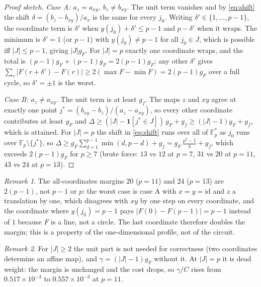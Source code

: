 \documentclass[11pt]{article}
\theoremstyle{remark}
\newtheorem{remark}{Remark}
\newcommand{\F}{\mathbb{F}}
\newcommand{\cost}{C}
\newcommand{\gam}{\gamma}
\newcommand{\abs}[1]{\lvert #1 \rvert}
\newcommand{\ind}[1]{\mathbf{1}[#1]}
\begin{document}
\begin{proof}[Proof sketch]
\emph{Case A: $a_z = a_{xy}$, $b_z \ne b_{xy}$.} The unit term vanishes and by \eqref{eq:shift} the shift
$\delta = (b_z - b_{xy})/a_x$ is the same for every $j_0$. Writing $\delta' \in \{1, \dots, p-1\}$, the coordinate term is $\delta'$
when $y(j_0) + \delta' \le p-1$ and $p - \delta'$ when it wraps. The minimum is $\delta' = 1$ (or $p-1$) with $y(j_0) \ne p-1$ for all
$j_0 \in J$, which is possible iff $\abs{J} \le p-1$, giving $\abs{J} g_F$. For $\abs{J} = p$ exactly one coordinate wraps, and the
total is $(p-1) g_F + (p-1) g_F = 2(p-1) g_F$; any other $\delta'$ gives $\sum_r \abs{F(r+\delta') - F(r)} \ge 2(\max F - \min F) = 2(p-1) g_F$
over a full cycle, so $\delta' = \pm 1$ is the worst.

\emph{Case B: $a_z \ne a_{xy}$.} The unit term is at least $g_f$. The maps $z$ and $xy$ agree at exactly one point
$j^{*} = (b_{xy} - b_z)/(a_z - a_{xy})$, so every other coordinate contributes at least $g_F$ and
$\Delta \ge (\abs{J} - \ind{j^{*} \in J})\, g_F + g_f \ge (\abs{J}-1) g_F + g_f$, which is attained. For $\abs{J} = p$ the shift in
\eqref{eq:shift} runs over all of $\F_p^{*}$ as $j_0$ runs over $\F_p \setminus \{j^{*}\}$, so
$\Delta \ge g_F \sum_{d=1}^{p-1} \min(d, p-d) + g_f = g_F\,\tfrac{p^2-1}{4} + g_f$, which exceeds $2(p-1) g_F$ for $p \ge 7$
(brute force: $13$ vs $12$ at $p=7$, $31$ vs $20$ at $p=11$, $43$ vs $24$ at $p=13$).
\end{proof}

\begin{remark}
The all-coordinates margins $20$ ($p=11$) and $24$ ($p=13$) are $2(p-1)$, not $p-1$ or $p$: the worst case is case A with
$x = y = \mathrm{id}$ and $z$ a translation by one, which disagrees with $xy$ by one step on every coordinate, and the coordinate
where $y(j_0) = p-1$ pays $\abs{F(0) - F(p-1)} = p-1$ instead of $1$ because $F$ is a line, not a circle. The last coordinate
therefore doubles the margin; this is a property of the one-dimensional profile, not of the circuit.
\end{remark}

\begin{remark}
For $\abs{J} \ge 2$ the unit part is not needed for correctness (two coordinates determine an affine map), and
$\gam = (\abs{J}-1) g_F$ without it. At $\abs{J} = p$ it is dead weight: the margin is unchanged and the cost drops, so
$\gam/\cost$ rises from $0.517 \times 10^{-3}$ to $0.557 \times 10^{-3}$ at $p = 11$.
\end{remark}
\end{document}
